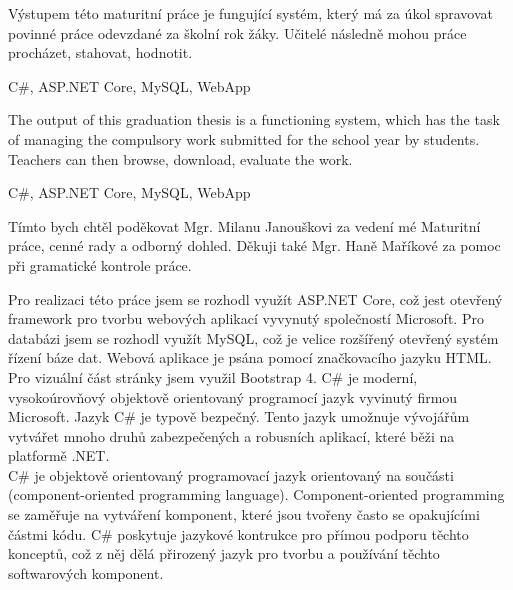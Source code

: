 \documentclass[a4paper, 12pt]{report}
\begin{document}
	
	\titulniStrana
	
	\anotace
	Výstupem této maturitní práce je fungující systém, který má za úkol spravovat povinné práce odevzdané za školní rok žáky. Učitelé následně mohou práce procházet, stahovat, hodnotit.

	\klicovaslova
	C\#, ASP.NET Core, MySQL, WebApp

	\annotation
	The output of this graduation thesis is a functioning system, which has the task of managing the compulsory work submitted for the school year by students. Teachers can then browse, download, evaluate the work.

	\keywords
	C\#, ASP.NET Core, MySQL, WebApp

	\podekovani
	Tímto bych chtěl poděkovat Mgr. Milanu Janouškovi za vedení mé Maturitní práce, cenné rady a odborný dohled. Děkuji také Mgr. Haně Maříkové za pomoc při gramatické kontrole práce.
	
	\obsah
	
	Pro realizaci této práce jsem se rozhodl využít ASP.NET Core, což jest otevřený framework pro tvorbu webových aplikací vyvynutý společností Microsoft. Pro databázi jsem se rozhodl využít MySQL, což je velice rozšířený otevřený systém řízení báze dat. Webová aplikace je psána pomocí značkovacího jazyku HTML. Pro vizuální část stránky jsem využil Bootstrap 4.
	C\# je moderní, vysokoúrovňový objektově orientovaný programocí jazyk vyvinutý firmou Microsoft. Jazyk C\# je typově bezpečný. Tento jazyk umožnuje vývojářům vytvářet mnoho druhů zabezpečených a robusních aplikací, které běži na platformě .NET.\\
	C\# je objektově orientovaný programovací jazyk orientovaný na součásti (component-oriented programming language). Component-oriented programming se zaměřuje na vytváření komponent, které jsou tvořeny často se opakujícími částmi kódu. C\# poskytuje jazykové kontrukce pro přímou podporu těchto konceptů, což z něj dělá přirozený jazyk pro tvorbu a používání těchto softwarových komponent.


	\seznamTabulek
	
	\seznamObrazku
	
	
	
\end{document}
